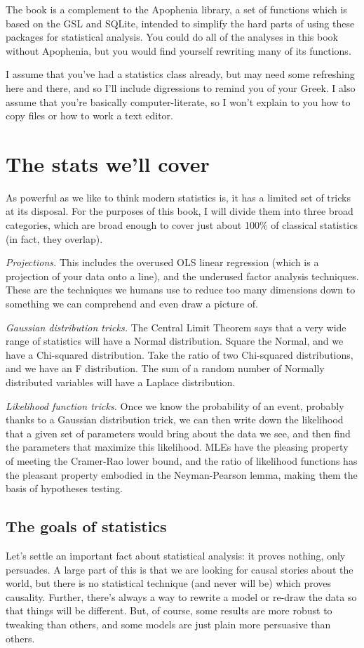 \documentclass[12pt,notitlepage, openany]{book}
\def\ind#1{\index{#1}#1}
\begin{document}
The book is a complement to the \ind{Apophenia} library, a set of functions which
is based on the GSL and SQLite, intended to simplify the hard parts of
using these packages for statistical analysis. You could do all of the
analyses in this book without Apophenia, but you would find yourself
rewriting many of its functions.

I assume that you've had a statistics class already, but may need some refreshing
here and there, and so I'll include digressions to remind you of your Greek. I also
assume that you're basically computer-literate, so I won't explain to you how to
copy files or how to work a text editor.

\section{The stats we'll cover} 
As powerful as we like to think modern statistics is, it has a 
limited set of tricks at its disposal. For the purposes of this book,
I will divide them into three broad categories, which are broad enough
to cover just about 100\% of classical statistics (in fact, they overlap).

{\it Projections.} This includes the overused OLS linear regression (which is
a projection of your data onto a line), and the underused factor analysis
techniques. These are the techniques we humans use to reduce too many
dimensions down to something we can comprehend and even draw a picture of.

{\it Gaussian distribution tricks.} The Central Limit Theorem says that
a very wide range of statistics will have a Normal distribution. Square
the Normal, and we have a Chi-squared distribution. Take the ratio of two
Chi-squared distributions, and we have an F distribution.  The sum of
a random number of Normally distributed variables will have a Laplace
distribution.

{\it Likelihood function tricks.} Once we know the probability of an
event, probably thanks to a Gaussian distribution trick, we can then
write down the likelihood that a given set of parameters would bring
about the data we see, and then find the parameters that maximize this
likelihood. MLEs have the pleasing property of meeting the Cramer-Rao
lower bound, and the ratio of likelihood functions has the pleasant
property embodied in the Neyman-Pearson lemma, making them the basis of
hypotheses testing.

\subsection{The goals of statistics} Let's settle an
important fact about statistical analysis: it proves nothing, only
persuades. A large part of this is that we are looking for causal stories
about the world, but there is no statistical technique (and never will be)
which proves causality. Further, there's always a way to rewrite a model
or re-draw the data so that things will be different. But, of course,
some results are more robust to tweaking 
than others, and some models are just plain more persuasive than others.
\end{document}

